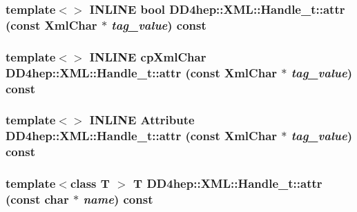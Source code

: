 \label{class_d_d4hep_1_1_x_m_l_1_1_handle__t_a7a07d45494000e6a516adba15fb377ee}
\hypertarget{class_d_d4hep_1_1_x_m_l_1_1_handle__t_a02dfeae7ede51d6050f15e9ad68bd72a}{
\subsubsection[{attr}]{\setlength{\rightskip}{0pt plus 5cm}template$<$$>$ INLINE bool DD4hep::XML::Handle\_\-t::attr (const {\bf XmlChar} $\ast$ {\em tag\_\-value}) const}}
\label{class_d_d4hep_1_1_x_m_l_1_1_handle__t_a02dfeae7ede51d6050f15e9ad68bd72a}
\hypertarget{class_d_d4hep_1_1_x_m_l_1_1_handle__t_a8a9db77ecaf5aabaae482bc35a313115}{
\subsubsection[{attr}]{\setlength{\rightskip}{0pt plus 5cm}template$<$$>$ INLINE {\bf cpXmlChar} DD4hep::XML::Handle\_\-t::attr (const {\bf XmlChar} $\ast$ {\em tag\_\-value}) const}}
\label{class_d_d4hep_1_1_x_m_l_1_1_handle__t_a8a9db77ecaf5aabaae482bc35a313115}
\hypertarget{class_d_d4hep_1_1_x_m_l_1_1_handle__t_a4c022784fbe30031ef263dd5f2b3b069}{
\subsubsection[{attr}]{\setlength{\rightskip}{0pt plus 5cm}template$<$$>$ INLINE {\bf Attribute} DD4hep::XML::Handle\_\-t::attr (const {\bf XmlChar} $\ast$ {\em tag\_\-value}) const}}
\label{class_d_d4hep_1_1_x_m_l_1_1_handle__t_a4c022784fbe30031ef263dd5f2b3b069}
\hypertarget{class_d_d4hep_1_1_x_m_l_1_1_handle__t_aea59fed044f5d3cfbf0c27256e47375e}{
\subsubsection[{attr}]{\setlength{\rightskip}{0pt plus 5cm}template$<$class T $>$ {\bf T} DD4hep::XML::Handle\_\-t::attr (const char $\ast$ {\em name}) const}}
\label{class_d_d4hep_1_1_x_m_l_1_1_handle__t_aea59fed044f5d3cfbf0c27256e47375e}


